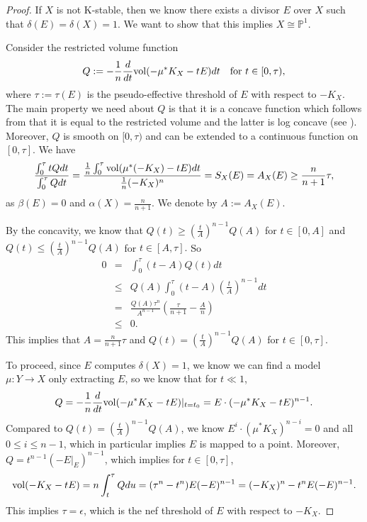 \documentclass[12pt,reqno]{amsart}%
\theoremstyle{definition}
\theoremstyle{remark}
\newcommand{\vol}{{\rm vol}}
\begin{document}
\begin{proof}%
If $X$ is not K-stable, then we know there exists a divisor $E$ over $X$ such that $\delta(E)=\delta(X)=1$. We want to show that this implies $X\cong \mathbb{P}^1$.

Consider the restricted volume function 
\[
Q:=-\frac{1}{n}\frac{d}{dt}\vol(-\mu^*K_X-tE)dt \mbox{ \ \ for } t\in [0,\tau),\]
 where $\tau:=\tau(E)$ is the pseudo-effective threshold of $E$ with respect to $-K_X$. The main property we need about $Q$ is that  it is a concave function which follows from that it is equal to the restricted volume and the latter is log concave (see \cite{ELMNP09}). Moreover, $Q$ is smooth on $[0,\tau)$ and can be extended to a continuous function on $[0,\tau]$.
We have
 \begin{eqnarray}
 \frac{\int^{\tau}_0 tQdt}{\int^{\tau}_0Q dt}=\frac{\frac{1}{n}\int^{\tau}_{0}\vol(\mu^*(-K_X)-tE)dt}{\frac{1}{n}(-K_X)^n}=S_X(E)=A_{X}(E)\ge\frac{n}{n+1}\tau,
 \end{eqnarray}
  as $\beta(E)=0$ and $\alpha(X)=\frac{n}{n+1}$. We denote by $A:=A_{X}(E)$.
  
  By the concavity, we know that $Q(t)\ge (\frac{t}{A})^{n-1}Q(A)$ for $t\in [0,A]$ and $Q(t)\le (\frac{t}{A})^{n-1}Q(A)$ for $t\in [A,\tau].$
  So 
  \begin{eqnarray*}
  0&=&\int^{\tau}_{0}(t-A)Q(t)dt\\
  &\le& Q(A)\int^{\tau}_{0}(t-A)(\frac{t}{A})^{n-1}dt\\
  &=&\frac{Q(A) \tau^n}{A^{n-1}}(\frac{\tau}{n+1}-\frac{A}{n})\\
  &\le &0.
  \end{eqnarray*}
This implies that $A=\frac{n}{n+1}\tau$ and $Q(t)= (\frac{t}{A})^{n-1}Q(A)$ for $t\in[0,\tau]$.

To proceed, since $E$ computes $\delta(X)=1$, we know we can find a model $\mu\colon Y\to X$ only extracting $E$, so we know that for $t\ll 1$,
$$Q=-\frac{1}{n}\frac{d}{dt}\vol(-\mu^*K_X-t E)|_{t=t_0}=E\cdot(-\mu^*K_X-tE)^{n-1}.$$
Compared to $Q(t)= (\frac{t}{A})^{n-1}Q(A)$, we know $E^i\cdot (\mu^*K_X)^{n-i}=0$ and all $0\le i \le n-1$, which in particular implies $E$ is mapped to a point.   Moreover, $Q=t^{n-1}(-E|_E)^{n-1}$, which implies for $t\in [0,\tau]$,
$$\vol(-K_X-tE)=n\int^{\tau}_{t}Qdu=(\tau^n-t^n)E(-E)^{n-1}=(-K_X)^n-t^nE(-E)^{n-1}.$$
 This implies $\tau=\epsilon$, which is the nef threshold of $E$ with respect to $-K_X$. 
 
  

\end{proof}
\end{document}
